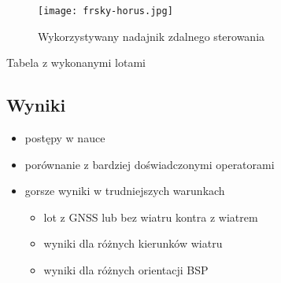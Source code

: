 \begin{figure}[!h]
    \centering \texttt{[image: frsky-horus.jpg]}
    \caption{Wykorzystywany nadajnik zdalnego sterowania}
    \label{fig:frsky-horus}
\end{figure}

\begin{todo}
    Tabela z wykonanymi lotami
\end{todo}

\subsection{Wyniki}
\begin{todo}
    \begin{itemize}
        \item postępy w nauce
        \item porównanie z bardziej doświadczonymi operatorami
        \item gorsze wyniki w trudniejszych warunkach
        \begin{itemize}
            \item lot z GNSS lub bez wiatru kontra z wiatrem
            \item wyniki dla różnych kierunków wiatru
            \item wyniki dla różnych orientacji BSP
        \end{itemize}
    \end{itemize}
\end{todo}
